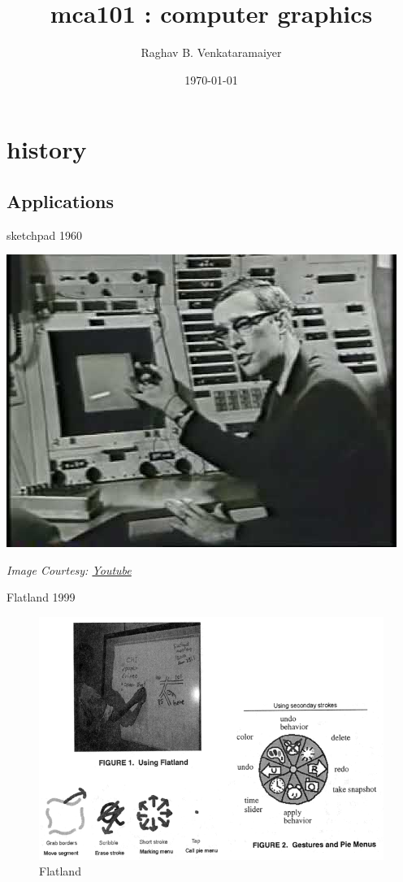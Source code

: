 \documentclass[aspectratio=169,xcolor={dvipsnames,svgnames}]{beamer}
\date{}
\title{mca101 : computer graphics}
\author{%
\normalsize Raghav B. Venkataramaiyer
}
\institute{%
CSED TIET Patiala India.
}
\date{\scriptsize \today}
\begin{document}
\maketitle

\section{history}
\label{sec:org3e6d7fa}

\subsection{Applications}
\label{sec:orgf46d8c9}

\begin{frame}[label={sec:org3bbaf97}]{sketchpad 1960}
\centering

\begin{center}
\includegraphics[width=0.5\linewidth]{images/sutherland-sketchpad.jpg}
\end{center}
\tiny \emph{Image Courtesy: \href{https://www.youtube.com/watch?v=ztRtFEwyXnY}{Youtube}}
\end{frame}

\begin{frame}[label={sec:org6d0a567}]{Flatland 1999}
\begin{figure}[htbp]
\centering
\includegraphics[width=0.6\linewidth]{images/flatland-1999.png}
\caption{Flatland \cite{MIEL99}}
\end{figure}
\end{frame}
\end{document}
